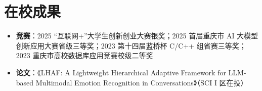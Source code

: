 \documentclass[10pt]{article}
\begin{document}



    \section[在校成果]{\makebox[\iconwidth][c]{\color{primarycolor}{\faAward}}\quad 在校成果}
    \begin{itemize}
        \item \textbf{竞赛}：2025 “互联网+”大学生创新创业大赛银奖；2025 首届重庆市 AI 大模型创新应用大赛省级三等奖；2023 第十四届蓝桥杯 C/C++ 组省赛三等奖；2023 重庆市高校数据库应用竞赛校级二等奖
        \item \textbf{论文}：《LHAF: A Lightweight Hierarchical Adaptive Framework for LLM-based Multimodal Emotion Recognition in Conversations》（SCI I 区在投）
    \end{itemize}
\end{document}
